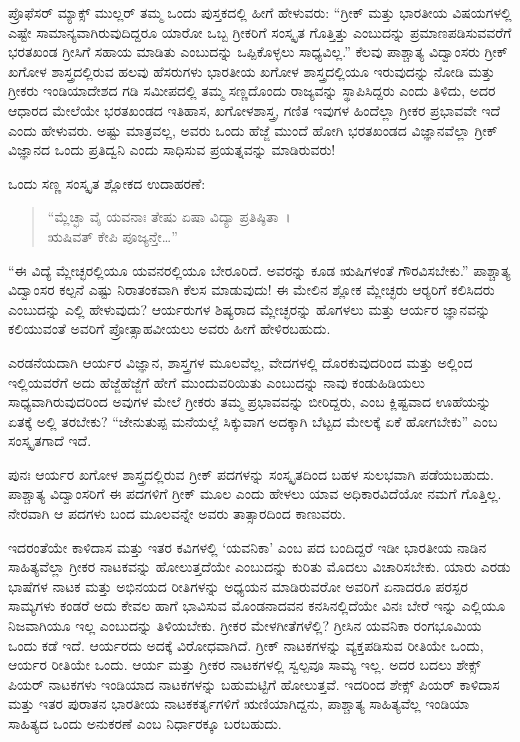  ಪ್ರೊಫೆಸರ್ ಮ್ಯಾಕ್ಸ್ ಮುಲ್ಲರ್ ತಮ್ಮ ಒಂದು ಪುಸ್ತಕದಲ್ಲಿ ಹೀಗೆ ಹೇಳುವರು: “ಗ್ರೀಕ್ ಮತ್ತು ಭಾರತೀಯ ವಿಷಯಗಳಲ್ಲಿ ಎಷ್ಟೇ ಸಾಮಾನ್ಯವಾಗಿರುವುದಿದ್ದರೂ ಯಾರೋ ಒಬ್ಬ ಗ್ರೀಕರಿಗೆ ಸಂಸ್ಕೃತ ಗೊತ್ತಿತ್ತು ಎಂಬುದನ್ನು ಪ್ರಮಾಣಪಡಿಸುವವರೆಗೆ ಭರತಖಂಡ ಗ್ರೀಸಿಗೆ ಸಹಾಯ ಮಾಡಿತು ಎಂಬುದನ್ನು ಒಪ್ಪಿಕೊಳ್ಳಲು ಸಾಧ್ಯವಿಲ್ಲ.” ಕೆಲವು ಪಾಶ್ಚಾತ್ಯ ವಿದ್ವಾಂಸರು ಗ್ರೀಕ್ ಖಗೋಳ ಶಾಸ್ತ್ರದಲ್ಲಿರುವ ಹಲವು ಹೆಸರುಗಳು ಭಾರತೀಯ ಖಗೋಳ ಶಾಸ್ತ್ರದಲ್ಲಿಯೂ ಇರುವುದನ್ನು ನೋಡಿ ಮತ್ತು ಗ್ರೀಕರು ಇಂಡಿಯಾದೇಶದ ಗಡಿ ಸಮೀಪದಲ್ಲಿ ತಮ್ಮ ಸಣ್ಣದೊಂದು ರಾಜ್ಯವನ್ನು ಸ್ಥಾಪಿಸಿದ್ದರು ಎಂದು ತಿಳಿದು, ಅದರ ಆಧಾರದ ಮೇಲೆಯೇ ಭರತಖಂಡದ ಇತಿಹಾಸ, ಖಗೋಳಶಾಸ್ತ್ರ, ಗಣಿತ ಇವುಗಳ ಹಿಂದೆಲ್ಲಾ ಗ್ರೀಕರ ಪ್ರಭಾವವೇ ಇದೆ ಎಂದು ಹೇಳುವರು. ಅಷ್ಟು ಮಾತ್ರವಲ್ಲ, ಅವರು ಒಂದು ಹೆಜ್ಜೆ ಮುಂದೆ ಹೋಗಿ ಭರತಖಂಡದ ವಿಜ್ಞಾನವೆಲ್ಲಾ ಗ್ರೀಕ್ ವಿಜ್ಞಾನದ ಒಂದು ಪ್ರತಿದ್ವನಿ ಎಂದು ಸಾಧಿಸುವ ಪ್ರಯತ್ನವನ್ನು ಮಾಡಿರುವರು! 

 ಒಂದು ಸಣ್ಣ ಸಂಸ್ಕೃತ ಶ್ಲೋಕದ ಉದಾಹರಣೆ:

\begin{verse}
“ಮ್ಲೆಚ್ಛಾ ವೈ ಯವನಾಃ ತೇಷು ಏಷಾ ವಿದ್ಯಾ ಪ್ರತಿಷ್ಠಿತಾ~।\\ಋಷಿವತ್ ಕೇಪಿ ಪೂಜ್ಯನ್ತೇ…” 
\end{verse}

 “ಈ ವಿದ್ಯೆ ಮ್ಲೇಚ್ಛರಲ್ಲಿಯೂ ಯವನರಲ್ಲಿಯೂ ಬೇರೂರಿದೆ. ಅವರನ್ನು ಕೂಡ ಋಷಿಗಳಂತೆ ಗೌರವಿಸಬೇಕು.” ಪಾಶ್ಚಾತ್ಯ ವಿದ್ವಾಂಸರ ಕಲ್ಪನೆ ಎಷ್ಟು ನಿರಾತಂಕವಾಗಿ ಕೆಲಸ ಮಾಡುವುದು! ಈ ಮೇಲಿನ ಶ್ಲೋಕ ಮ್ಲೇಚ್ಛರು ಆರ‍್ಯರಿಗೆ ಕಲಿಸಿದರು ಎಂಬುದನ್ನು ಎಲ್ಲಿ ಹೇಳುವುದು? ಆರ್ಯರುಗಳ ಶಿಷ್ಯರಾದ ಮ್ಲೇಚ್ಛರನ್ನು ಹೊಗಳಲು ಮತ್ತು ಆರ್ಯರ ಜ್ಞಾನವನ್ನು ಕಲಿಯುವಂತೆ ಅವರಿಗೆ ಪ್ರೋತ್ಸಾಹವೀಯಲು ಅವರು ಹೀಗೆ ಹೇಳಿರಬಹುದು. 

 ಎರಡನೆಯದಾಗಿ ಆರ್ಯರ ವಿಜ್ಞಾನ, ಶಾಸ್ತ್ರಗಳ ಮೂಲವೆಲ್ಲ, ವೇದಗಳಲ್ಲಿ ದೊರಕುವುದರಿಂದ ಮತ್ತು ಅಲ್ಲಿಂದ ಇಲ್ಲಿಯವರೆಗೆ ಅದು ಹೆಜ್ಜೆಹೆಜ್ಜೆಗೆ ಹೇಗೆ ಮುಂದುವರಿಯಿತು ಎಂಬುದನ್ನು ನಾವು ಕಂಡುಹಿಡಿಯಲು ಸಾಧ್ಯವಾಗಿರುವುದರಿಂದ ಅವುಗಳ ಮೇಲೆ ಗ್ರೀಕರು ತಮ್ಮ ಪ್ರಭಾವವನ್ನು ಬೀರಿದ್ದರು, ಎಂಬ ಕ್ಲಿಷ್ಟವಾದ ಊಹೆಯನ್ನು ಏತಕ್ಕೆ ಅಲ್ಲಿ ತರಬೇಕು? “ಜೇನುತುಪ್ಪ ಮನೆಯಲ್ಲೆ ಸಿಕ್ಕುವಾಗ ಅದಕ್ಕಾಗಿ ಬೆಟ್ಟದ ಮೇಲಕ್ಕೆ ಏಕೆ ಹೋಗಬೇಕು” ಎಂಬ ಸಂಸ್ಕೃತಗಾದೆ ಇದೆ. 

 ಪುನಃ ಆರ್ಯರ ಖಗೋಳ ಶಾಸ್ತ್ರದಲ್ಲಿರುವ ಗ್ರೀಕ್ ಪದಗಳನ್ನು ಸಂಸ್ಕೃತದಿಂದ ಬಹಳ ಸುಲಭವಾಗಿ ಪಡೆಯಬಹುದು. ಪಾಶ್ಚಾತ್ಯ ವಿದ್ವಾಂಸರಿಗೆ ಈ ಪದಗಳಿಗೆ ಗ್ರೀಕ್ ಮೂಲ ಎಂದು ಹೇಳಲು ಯಾವ ಅಧಿಕಾರವಿದೆಯೋ ನಮಗೆ ಗೊತ್ತಿಲ್ಲ. ನೇರವಾಗಿ ಆ ಪದಗಳು ಬಂದ ಮೂಲವನ್ನೇ ಅವರು ತಾತ್ಸಾರದಿಂದ ಕಾಣುವರು. 

 ಇದರಂತೆಯೇ ಕಾಳಿದಾಸ ಮತ್ತು ಇತರ ಕವಿಗಳಲ್ಲಿ ‘ಯವನಿಕಾ’ ಎಂಬ ಪದ ಬಂದಿದ್ದರೆ ಇಡೀ ಭಾರತೀಯ ನಾಡಿನ ಸಾಹಿತ್ಯವೆಲ್ಲಾ ಗ್ರೀಕರ ನಾಟಕವನ್ನು ಹೋಲು\-ತ್ತದೆಯೇ ಎಂಬುದನ್ನು ಕುರಿತು ಮೊದಲು ವಿಚಾರಿಸಬೇಕು. ಯಾರು ಎರಡು ಭಾಷೆಗಳ ನಾಟಕ ಮತ್ತು ಅಭಿನಯದ ರೀತಿಗಳನ್ನು ಅಧ್ಯಯನ ಮಾಡಿರುವರೋ ಅವರಿಗೆ ಏನಾದರೂ ಪರಸ್ಪರ ಸಾಮ್ಯಗಳು ಕಂಡರೆ ಅದು ಕೇವಲ ಹಾಗೆ ಭಾವಿಸುವ ಮೊಂಡನಾದವನ ಕನಸಿನಲ್ಲಿದೆಯೇ ವಿನಃ ಬೇರೆ ಇನ್ನು ಎಲ್ಲಿಯೂ ನಿಜವಾಗಿಯೂ ಇಲ್ಲ ಎಂಬುದನ್ನು ತಿಳಿಯಬೇಕು. ಗ್ರೀಕರ ಮೇಳಗೀತೆಗಳೆಲ್ಲಿ? ಗ್ರೀಸಿನ ಯವನಿಕಾ ರಂಗಭೂಮಿಯ ಒಂದು ಕಡೆ ಇದೆ. ಆರ್ಯರದು ಅದಕ್ಕೆ ವಿರೋಧವಾಗಿದೆ. ಗ್ರೀಕ್ ನಾಟಕಗಳನ್ನು ವ್ಯಕ್ತಪಡಿಸುವ ರೀತಿಯೇ ಒಂದು, ಆರ್ಯರ ರೀತಿಯೇ ಒಂದು. ಆರ್ಯ ಮತ್ತು ಗ್ರೀಕರ ನಾಟಕಗಳಲ್ಲಿ ಸ್ವಲ್ಪವೂ ಸಾಮ್ಯ ಇಲ್ಲ. ಅದರ ಬದಲು ಶೇಕ್ಸ್ ಪಿಯರ್ ನಾಟಕಗಳು ಇಂಡಿಯಾದ ನಾಟಕಗಳನ್ನು ಬಹುಮಟ್ಟಿಗೆ ಹೋಲುತ್ತವೆ. ಇದರಿಂದ ಶೇಕ್ಸ್ ಪಿಯರ್ ಕಾಳಿದಾಸ ಮತ್ತು ಇತರ ಪುರಾತನ ಭಾರತೀಯ ನಾಟಕಕರ್ತೃಗಳಿಗೆ ಋಣಿಯಾಗಿದ್ದನು, ಪಾಶ್ಚಾತ್ಯ ಸಾಹಿತ್ಯವೆಲ್ಲ ಇಂಡಿಯಾ ಸಾಹಿತ್ಯದ ಒಂದು ಅನುಕರಣೆ ಎಂಬ ನಿರ್ಧಾರಕ್ಕೂ ಬರಬಹುದು. 

